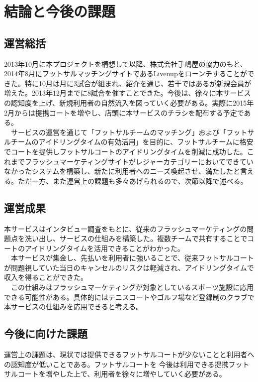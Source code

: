 \chapter{結論と今後の課題}
\label{intro}
\section{運営総括}
2013年10月に本プロジェクトを構想して以降、株式会社手嶋屋の協力のもと、2014年8月にフットサルマッチングサイトであるLivenupをローンチすることができた。特に10月は月に3試合が組まれ、紹介を通じ、若干ではあるが新規会員が増えた。2013年12月までに8試合を催すことできた。今後は、徐々に本サービスの認知度を上げ、新規利用者の自然流入を図っていく必要がある。実際に2015年2月からは提携コートを増やし、店頭に本サービスのチラシを配布する予定である。
\\　サービスの運営を通じて「フットサルチームのマッチング」および「フットサルチームのアイドリングタイムの有効活用」を目的に、フットサルチームに格安でコートを提供しフットサルコートのアイドリングタイムを削減に成功した。これまでフラッシュマーケティングサイトがレジャーカテゴリーにおいてできていなかったシステムを構築し、新たに利用者へのニーズ喚起させ、満たしたと言える。ただ一方、また運営上の課題も多々あげられるので、次節以降で述べる。
\section{運営成果}
本サービスはインタビュー調査をもとに、従来のフラッシュマーケティングの問題点を洗い出し、サービスの仕組みを構築した。複数チームで共有することでコートのアイドリングタイムを活用できることがわかった。
\\　本サービスが集金し、先払いを利用者に強いることで、従来フットサルコートが問題視していた当日のキャンセルのリスクは軽減され、アイドリングタイムで収入を得ることができた。
\\　この仕組みはフラッシュマーケティングが対象としているスポーツ施設に応用できる可能性がある。具体的にはテニスコートやゴルフ場など登録制のクラブで本サービスの仕組みを応用できると考える。
\section{今後に向けた課題}
運営上の課題は、現状では提供できるフットサルコートが少ないことと利用者への認知度が低いことである。フットサルコートを
今後は利用できる提携フットサルコートを増やした上で、利用者を徐々に増やしていく必要がある。
